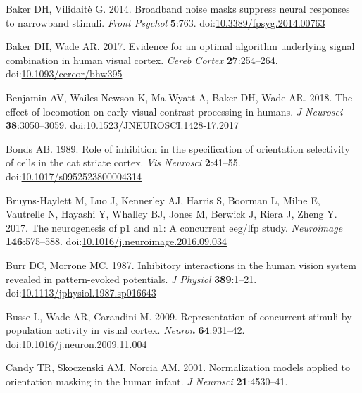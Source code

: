 \documentclass[]{article}
\begin{document}
\leavevmode\hypertarget{ref-Baker2014}{}%
Baker DH, Vilidaitė G. 2014. Broadband noise masks suppress neural responses to narrowband stimuli. \emph{Front Psychol} \textbf{5}:763. doi:\href{https://doi.org/10.3389/fpsyg.2014.00763}{10.3389/fpsyg.2014.00763}

\leavevmode\hypertarget{ref-Baker2017}{}%
Baker DH, Wade AR. 2017. Evidence for an optimal algorithm underlying signal combination in human visual cortex. \emph{Cereb Cortex} \textbf{27}:254--264. doi:\href{https://doi.org/10.1093/cercor/bhw395}{10.1093/cercor/bhw395}

\leavevmode\hypertarget{ref-Benjamin2018}{}%
Benjamin AV, Wailes-Newson K, Ma-Wyatt A, Baker DH, Wade AR. 2018. The effect of locomotion on early visual contrast processing in humans. \emph{J Neurosci} \textbf{38}:3050--3059. doi:\href{https://doi.org/10.1523/JNEUROSCI.1428-17.2017}{10.1523/JNEUROSCI.1428-17.2017}

\leavevmode\hypertarget{ref-Bonds1989}{}%
Bonds AB. 1989. Role of inhibition in the specification of orientation selectivity of cells in the cat striate cortex. \emph{Vis Neurosci} \textbf{2}:41--55. doi:\href{https://doi.org/10.1017/s0952523800004314}{10.1017/s0952523800004314}

\leavevmode\hypertarget{ref-Bruyns-Haylett2017}{}%
Bruyns-Haylett M, Luo J, Kennerley AJ, Harris S, Boorman L, Milne E, Vautrelle N, Hayashi Y, Whalley BJ, Jones M, Berwick J, Riera J, Zheng Y. 2017. The neurogenesis of p1 and n1: A concurrent eeg/lfp study. \emph{Neuroimage} \textbf{146}:575--588. doi:\href{https://doi.org/10.1016/j.neuroimage.2016.09.034}{10.1016/j.neuroimage.2016.09.034}

\leavevmode\hypertarget{ref-Burr1987}{}%
Burr DC, Morrone MC. 1987. Inhibitory interactions in the human vision system revealed in pattern-evoked potentials. \emph{J Physiol} \textbf{389}:1--21. doi:\href{https://doi.org/10.1113/jphysiol.1987.sp016643}{10.1113/jphysiol.1987.sp016643}

\leavevmode\hypertarget{ref-Busse2009}{}%
Busse L, Wade AR, Carandini M. 2009. Representation of concurrent stimuli by population activity in visual cortex. \emph{Neuron} \textbf{64}:931--42. doi:\href{https://doi.org/10.1016/j.neuron.2009.11.004}{10.1016/j.neuron.2009.11.004}

\leavevmode\hypertarget{ref-Candy2001}{}%
Candy TR, Skoczenski AM, Norcia AM. 2001. Normalization models applied to orientation masking in the human infant. \emph{J Neurosci} \textbf{21}:4530--41.
\end{document}
